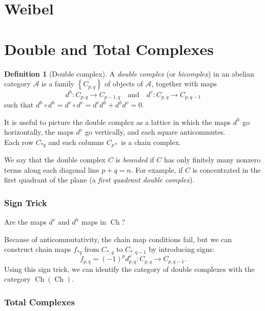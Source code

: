 \documentclass[reqno]{amsart}
\theoremstyle{definition}
\newtheorem{definition}[theorem]{Definition}
\theoremstyle{remark}
\DeclareMathOperator{\Ch}{Ch}
\begin{document}
\newpage
\section{Weibel}


\section{Double and Total Complexes}

\begin{definition}[Double complex]
    A \textit{double complex} (or \textit{bicomplex}) in
    an abelian category $\mathcal{A}$ is a family
    $\left\{ C_{p,q} \right\} $ of objects of $\mathcal{A}$,
    together with maps
    \[
    d^{h} \colon C_{p,q} \to C_{p-1,q} \quad
    \text{and} \quad
    d^{v} \colon C_{p,q} \to C_{p,q-1}
    \] 
    such that $d^{h} \circ d^{h} =
    d^{v} \circ d^{v} = d^{v} d^{h} +
    d^{h} d^{v} = 0$.
\end{definition}

It is useful to picture the double complex as a lattice
in which the maps $d^{h}$ go horizontally, the maps
$d^{v}$ go vertically, and each square anticommutes.\\
\linebreak
Each row $C_{*q}$ and each
columns $C_{p*}$ is a chain complex.

We say that the double complex
$C$ is \textit{bounded} if $C$ has only finitely many
nonzero terms along each diagonal line
$p+q = n$.
For example, if $C$ is concentrated in the first quadrant of
the plane (a \textit{first quadrant double complex}).


\subsubsection{Sign Trick}

Are the maps
$d^{v}$ and $d^{h}$ maps in
$\Ch$?

Because of anticommutativity, the chain map conditions fail, but
we can construct chain maps
$f_{*q} $ from $C_{*,q}$ to $C_{*,q-1}$ by introducing signs:
\[
f_{p,q} = (-1)^{p} d_{p,q}^{v} \colon
C_{p,q} \to C_{p,q-1}.
\] 
Using this sign trick, we can identify the category of double
complexes with the category
$\Ch \left( \Ch \right) $.

\subsubsection{Total Complexes}
\end{document}
